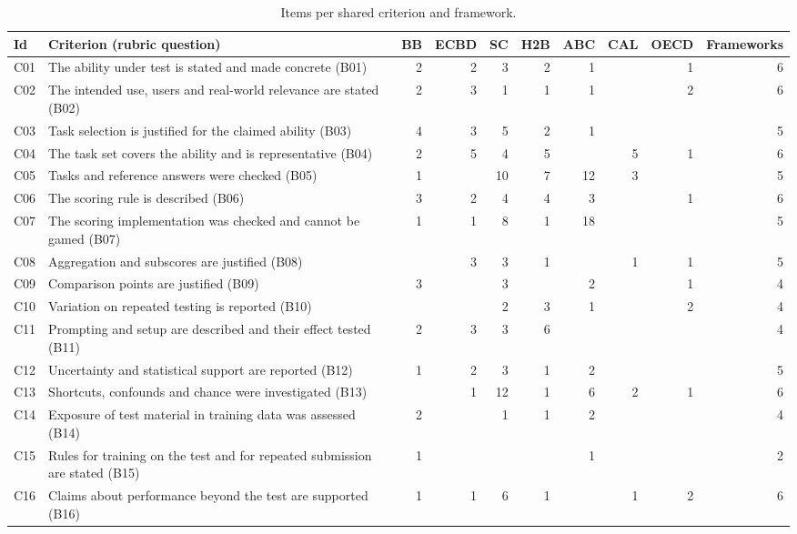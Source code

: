 \documentclass[10pt,conference]{IEEEtran}
\begin{document}
\begin{table}[t]
\caption{Items per shared criterion and framework.}
\label{tab:coverage}
\centering
\scriptsize
\setlength{\tabcolsep}{3.5pt}
\begin{tabular}{@{}llrrrrrrrr@{}}
\toprule
\textbf{Id} & \textbf{Criterion (rubric question)} & \textbf{BB} & \textbf{ECBD} & \textbf{SC} & \textbf{H2B} & \textbf{ABC} & \textbf{CAL} & \textbf{OECD} & \textbf{Frameworks} \\
\midrule
C01 & The ability under test is stated and made concrete (B01) & 2 & 2 & 3 & 2 & 1 &  & 1 & 6 \\
C02 & The intended use, users and real-world relevance are stated (B02) & 2 & 3 & 1 & 1 & 1 &  & 2 & 6 \\
C03 & Task selection is justified for the claimed ability (B03) & 4 & 3 & 5 & 2 & 1 &  &  & 5 \\
\midrule
C04 & The task set covers the ability and is representative (B04) & 2 & 5 & 4 & 5 &  & 5 & 1 & 6 \\
C05 & Tasks and reference answers were checked (B05) & 1 &  & 10 & 7 & 12 & 3 &  & 5 \\
\midrule
C06 & The scoring rule is described (B06) & 3 & 2 & 4 & 4 & 3 &  & 1 & 6 \\
C07 & The scoring implementation was checked and cannot be gamed (B07) & 1 & 1 & 8 & 1 & 18 &  &  & 5 \\
C08 & Aggregation and subscores are justified (B08) &  & 3 & 3 & 1 &  & 1 & 1 & 5 \\
C09 & Comparison points are justified (B09) & 3 &  & 3 &  & 2 &  & 1 & 4 \\
\midrule
C10 & Variation on repeated testing is reported (B10) &  &  & 2 & 3 & 1 &  & 2 & 4 \\
C11 & Prompting and setup are described and their effect tested (B11) & 2 & 3 & 3 & 6 &  &  &  & 4 \\
C12 & Uncertainty and statistical support are reported (B12) & 1 & 2 & 3 & 1 & 2 &  &  & 5 \\
C13 & Shortcuts, confounds and chance were investigated (B13) &  & 1 & 12 & 1 & 6 & 2 & 1 & 6 \\
\midrule
C14 & Exposure of test material in training data was assessed (B14) & 2 &  & 1 & 1 & 2 &  &  & 4 \\
C15 & Rules for training on the test and for repeated submission are stated (B15) & 1 &  &  &  & 1 &  &  & 2 \\
C16 & Claims about performance beyond the test are supported (B16) & 1 & 1 & 6 & 1 &  & 1 & 2 & 6 \\

\end{tabular}
\end{table}
\end{document}
